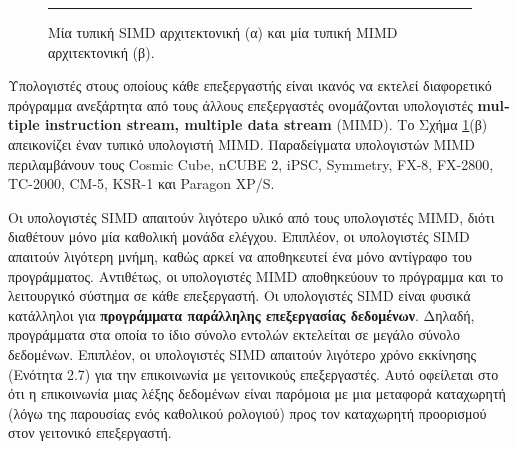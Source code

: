 \documentclass[12pt,a4paper]{article}
\begin{document}
\begin{figure}[H]
\noindent\rule{\textwidth}{0.2pt}
\caption{Μία τυπική \foreignlanguage{english}{SIMD} αρχιτεκτονική (α) και μία τυπική \foreignlanguage{english}{MIMD} αρχιτεκτονική (β).}
\label{fig:graph29}
\end{figure}
\vspace{0.3cm}

Υπολογιστές στους οποίους κάθε επεξεργαστής είναι ικανός να εκτελεί διαφορετικό
πρόγραμμα ανεξάρτητα από τους άλλους επεξεργαστές ονομάζονται υπολογιστές
\foreignlanguage{english}{\textbf{multiple instruction stream, multiple data stream} (MIMD)}. Το Σχήμα \ref{fig:graph29}(β)
απεικονίζει έναν τυπικό υπολογιστή \foreignlanguage{english}{MIMD}. Παραδείγματα υπολογιστών \foreignlanguage{english}{MIMD}
περιλαμβάνουν τους \foreignlanguage{english}{Cosmic Cube, nCUBE 2, iPSC, Symmetry, FX-8, FX-2800, TC-2000,
CM-5, KSR-1} και \foreignlanguage{english}{Paragon XP/S}.

Οι υπολογιστές \foreignlanguage{english}{SIMD} απαιτούν λιγότερο υλικό από τους υπολογιστές \foreignlanguage{english}{MIMD}, διότι
διαθέτουν μόνο μία καθολική μονάδα ελέγχου. Επιπλέον, οι υπολογιστές \foreignlanguage{english}{SIMD} απαιτούν
λιγότερη μνήμη, καθώς αρκεί να αποθηκευτεί ένα μόνο αντίγραφο του προγράμματος.
Αντιθέτως, οι υπολογιστές \foreignlanguage{english}{MIMD} αποθηκεύουν το πρόγραμμα και το λειτουργικό σύστημα
σε κάθε επεξεργαστή. Οι υπολογιστές \foreignlanguage{english}{SIMD} είναι φυσικά κατάλληλοι για
\textbf{προγράμματα παράλληλης επεξεργασίας δεδομένων}. Δηλαδή, προγράμματα
στα οποία το ίδιο σύνολο εντολών εκτελείται σε μεγάλο σύνολο δεδομένων. Επιπλέον,
οι υπολογιστές \foreignlanguage{english}{SIMD} απαιτούν λιγότερο χρόνο εκκίνησης (Ενότητα 2.7) για την
επικοινωνία με γειτονικούς επεξεργαστές. Αυτό οφείλεται στο ότι η επικοινωνία μιας λέξης 
δεδομένων είναι παρόμοια με μια μεταφορά καταχωρητή (λόγω της παρουσίας 
ενός καθολικού ρολογιού) προς τον καταχωρητή προορισμού στον γειτονικό 
επεξεργαστή.
\end{document}
